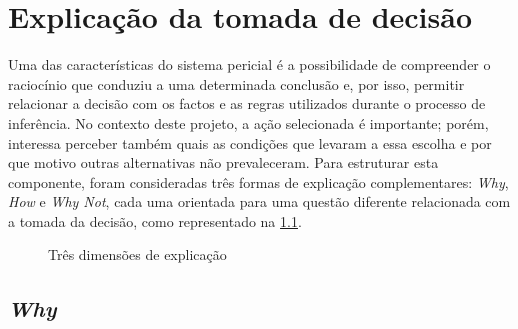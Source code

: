 \chapter{Explicação da tomada de decisão}
\label{cap:explicacao}

Uma das características do sistema pericial é a possibilidade de compreender
o raciocínio que conduziu a uma determinada conclusão e, por isso, permitir
relacionar a decisão com os factos e as regras utilizados durante o processo
de inferência. No contexto deste projeto, a ação selecionada é importante;
porém, interessa perceber também quais as condições que levaram a essa
escolha e por que motivo outras alternativas não prevaleceram. Para
estruturar esta componente, foram consideradas três formas de explicação
complementares: \emph{Why}, \emph{How} e \emph{Why Not}, cada uma orientada
para uma questão diferente relacionada com a tomada da decisão, como
representado na \cref{fig:explicacao}.

\begin{figure}[H]
  \centering
  \caption{Três dimensões de explicação}
  \label{fig:explicacao}
\end{figure}

\section{\emph{Why}}
\label{sec:why}


